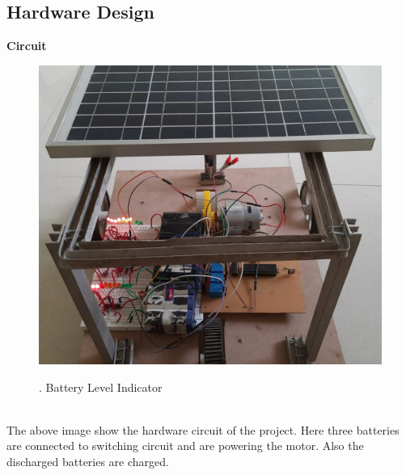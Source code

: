 \documentclass[a4paper,12pt]{article}
\begin{document}
\subsection{Hardware Design}
\textbf{Circuit}\\[1cm]
\begin{figure}[!h]
\centering
\includegraphics[scale=0.3]{hw1.jpeg}\\
\caption{. Battery Level Indicator}
\end{figure}\\
The above image show the hardware circuit of the project. Here three batteries are connected to switching circuit and are powering the motor. Also the discharged batteries are charged.
\end{document}
